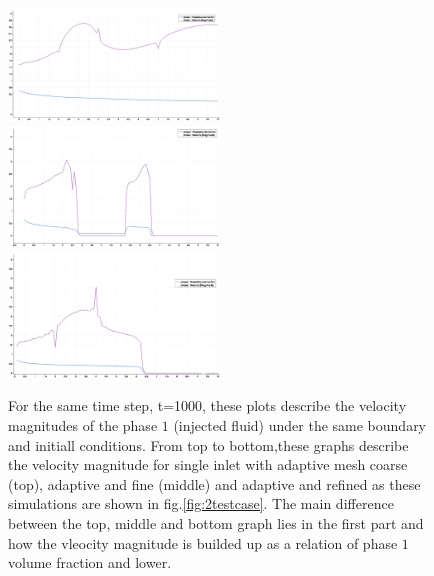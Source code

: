 \documentclass[preprint,authoryear,12pt]{elsarticle}
\begin{document}
\begin{figure}
\centering 
\includegraphics[width=0.5\textwidth]{./Pics1/mr10_4regions_python_only_adapt/4regions_python_only_coarse_vel_magn.pdf}\\[2mm]%
\includegraphics[width=0.5\textwidth]{./Pics1/mr10_4regions_python_only_adapt/4regions_python_only_adapt_vel_magn.pdf}\\[2mm]%
\includegraphics[width=0.5\textwidth]{./Pics1/mr10_4regions_python_only_adapt/4regions_python_only_adapt_refine_vel_mag.pdf}%
\caption{For the same time step, t=1000, these plots describe the velocity magnitudes of the phase $1$ (injected fluid) under the same boundary and initiall conditions. From top to bottom,these graphs describe the velocity magnitude for single inlet with adaptive mesh coarse (top), adaptive and fine (middle) and adaptive and refined as these simulations are shown in fig.\ref{fig:2testcase}. The main difference between the top, middle and bottom graph lies in the first part and how the vleocity magnitude is builded up as a relation of phase $1$ volume fraction and lower.}
\label{fig:vel_magn1}
\end{figure}
\end{document}
